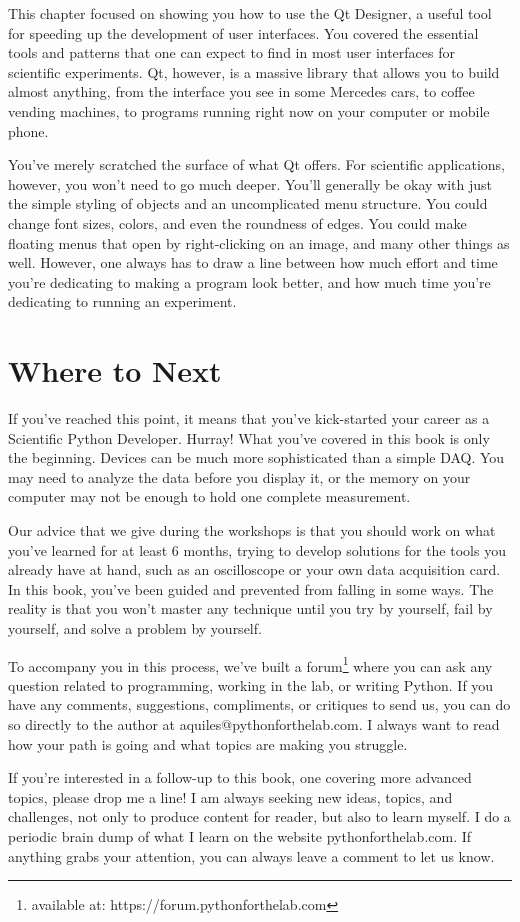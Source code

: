 This chapter focused on showing you how to use the Qt Designer, a useful tool for speeding up the development of user interfaces. You covered the essential tools and patterns that one can expect to find in most user interfaces for scientific experiments. Qt, however, is a massive library that allows you to build almost anything, from the interface you see in some Mercedes cars, to coffee vending machines, to programs running right now on your computer or mobile phone.

You've merely scratched the surface of what Qt offers. For scientific applications, however, you won't need to go much deeper. You'll generally be okay with just the simple styling of objects and an uncomplicated menu structure. You could change font sizes, colors, and even the roundness of edges. You could make floating menus that open by right-clicking on an image, and many other things as well. However, one always has to draw a line between how much effort and time you're dedicating to making a program look better, and how much time you're dedicating to running an experiment.

\section{Where to Next}\label{sec:where-to-next}
If you've reached this point, it means that you've kick-started your career as a Scientific Python Developer. Hurray! What you've covered in this book is only the beginning. Devices can be much more sophisticated than a simple DAQ. You may need to analyze the data before you display it, or the memory on your computer may not be enough to hold one complete measurement.

Our advice that we give during the workshops is that you should work on what you've learned for at least 6 months, trying to develop solutions for the tools you already have at hand, such as an oscilloscope or your own data acquisition card. In this book, you've been guided and prevented from falling in some ways. The reality is that you won't master any technique until you try by yourself, fail by yourself, and solve a problem by yourself.

To accompany you in this process, we've built a forum\footnote{available at: https://forum.pythonforthelab.com} where you can ask any question related to programming, working in the lab, or writing Python. If you have any comments, suggestions, compliments, or critiques to send us, you can do so directly to the author at aquiles@pythonforthelab.com. I always want to read how your path is going and what topics are making you struggle.

If you're interested in a follow-up to this book, one covering more advanced topics, please drop me a line! I am always seeking new ideas, topics, and challenges, not only to produce content for reader, but also to learn myself. I do a periodic brain dump of what I learn on the website pythonforthelab.com. If anything grabs your attention, you can always leave a comment to let us know.
